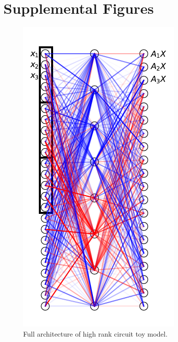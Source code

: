 \documentclass{article}
\theoremstyle{plain}
\theoremstyle{definition}
\theoremstyle{remark}
\begin{document}
\section{Supplemental Figures}


\begin{figure}[ht]
    \centerline{\includegraphics{../figures/s1_high_rank_circuit_setup.pdf}}
    \centering
    \caption{Full architecture of high rank circuit toy model.}\label{fig:s1_high_rank_circuit_setup}
\end{figure}
\end{document}
